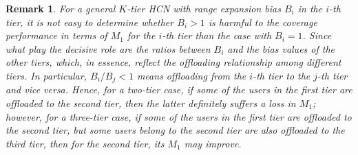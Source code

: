 \documentclass[12pt,draftclsnofoot,journal,onecolumn]{IEEEtran}
\newtheorem{remark}{Remark}
\begin{document}
\begin{remark}
	For a general $K$-tier HCN with range expansion bias $B_i$ in the $i$-th tier, it is not easy to determine whether $B_i>1$ is harmful to the coverage performance in terms of $M_1$ for the $i$-th tier than the case with $B_i=1$. Since what play the decisive role are the ratios between $B_i$ and the bias values of the other tiers, which, in essence, reflect the offloading relationship among different tiers. In particular, $B_i/B_j < 1$ means offloading from the $i$-th tier to the $j$-th tier and vice versa. Hence, for a two-tier case, if some of the users in the first tier are offloaded to the second tier, then the latter definitely suffers a loss in $M_1$; however, for a three-tier case, if some of the users in the first tier are offloaded to the second tier, but some users belong to the second tier are also offloaded to the third tier, then for the second tier, its $M_1$ may improve.  
\end{remark}
\end{document}
